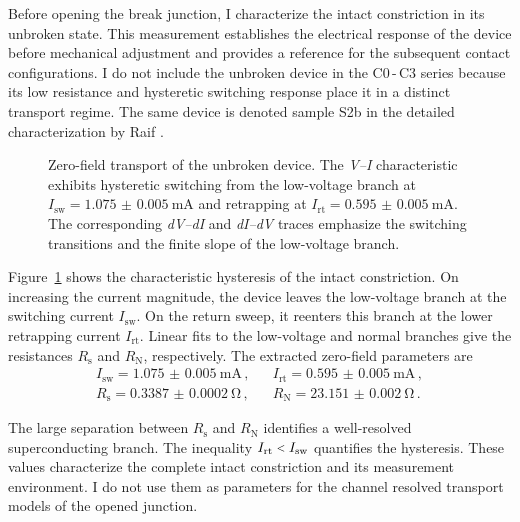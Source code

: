         Before opening the break junction, I characterize the intact constriction in its unbroken state. This measurement establishes the electrical response of the device before mechanical adjustment and provides a reference for the subsequent contact configurations. I do not include the unbroken device in the C0\,-\,C3 series because its low resistance and hysteretic switching response place it in a distinct transport regime. The same device is denoted sample S2b in the detailed characterization by Raif \cite{raif_electronic_2024}.

        \begin{figure}[t]
            \centering
            \hfill
            \hfill
            \caption{
                Zero-field transport of the unbroken device. The \textit{V--I} characteristic exhibits hysteretic switching from the low-voltage branch at $I_\mathrm{sw}=\qty{1.075(5)}{\milli\ampere}$ and retrapping at $I_\mathrm{rt}=\qty{0.595(5)}{\milli\ampere}$. The corresponding \textit{dV--dI} and \textit{dI--dV} traces emphasize the switching transitions and the finite slope of the low-voltage branch.
                }
            \label{fig:ac:magnetic-fields:unbroken:single-vi}
        \end{figure}

        Figure~\ref{fig:ac:magnetic-fields:unbroken:single-vi} shows the characteristic hysteresis of the intact constriction. On increasing the current magnitude, the device leaves the low-voltage branch at the switching current $I_\mathrm{sw}$. On the return sweep, it reenters this branch at the lower retrapping current $I_\mathrm{rt}$. Linear fits to the low-voltage and normal branches give the resistances $R_\mathrm{s}$ and $R_\mathrm{N}$, respectively. The extracted zero-field parameters are
        \begin{align}
            I_\mathrm{sw} = \qty{1.075(5)}{\milli\ampere}\,, &&
            I_\mathrm{rt} = \qty{0.595(5)}{\milli\ampere}\,, \\
            R_\mathrm{s} = \qty{0.3387(2)}{\ohm}\,, &&
            R_\mathrm{N} = \qty{23.151(2)}{\ohm}\,.
            \label{eq:ac:unbroken:transport}
        \end{align}

        The large separation between $R_\mathrm{s}$ and $R_\mathrm{N}$ identifies a well-resolved superconducting branch. The inequality $I_\mathrm{rt}\slt{}I_\mathrm{sw}$ quantifies the hysteresis. These values characterize the complete intact constriction and its measurement environment. I do not use them as parameters for the channel resolved transport models of the opened junction.

